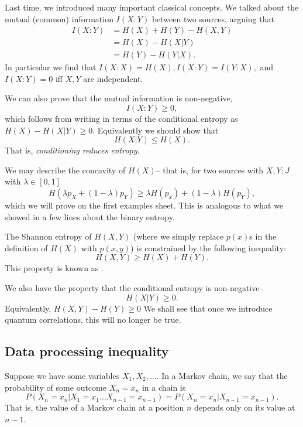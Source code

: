 Last time, we introduced many important classical concepts. We talked about the mutual (common) information $I(X:Y)$ between two sources, arguing that
\begin{align*}
    I(X:Y) &= H(X) + H(Y) - H(X,Y)\\
        &= H(X) - H(X|Y)\\
        &= H(Y)- H(Y|X).
\end{align*}
In particular we find that $I(X:X)=H(X), I(X:Y)=I(Y:X),$ and $I(X:Y)=0$ iff $X,Y$ are independent.

We can also prove that the mutual information is non-negative,
\begin{equation}
    I(X:Y) \geq 0,
\end{equation}
which follows from writing in terms of the conditional entropy as $H(X)-H(X|Y) \geq 0$. Equivalently we should show that
\begin{equation}
    H(X|Y) \leq H(X).
\end{equation}
That is, \emph{conditioning reduces entropy}.

We may describe the concavity of $H(X)$-- that is, for two sources with $X,Y; J$ with $\lambda\in [0,1]$
\begin{equation}
    H(\lambda p_X +(1-\lambda)p_Y) \geq \lambda H(p_x) + (1-\lambda) H(p_Y),
\end{equation}
which we will prove on the first examples sheet. This is analogous to what we showed in a few lines about the binary entropy.

The Shannon entropy of $H(X,Y)$ (where we simply replace $p(x)$s in the definition of $H(X)$ with $p(x,y)$) is constrained by the following inequality:
\begin{equation}
    H(X,Y) \geq H(X) + H(Y).
\end{equation}
This property is known as .

We also have the property that the conditional entropy is non-negative--
\begin{equation}
    H(X|Y) \geq 0.
\end{equation}
Equivalently, $H(X,Y) - H(Y) \geq 0$
We shall see that once we introduce quantum correlations, this will no longer be true.

\subsection*{Data processing inequality}
Suppose we have some variables $X_1,X_2,\ldots$. In a Markov chain, we say that the probability of some outcome $X_n=x_n$ in a chain is
\begin{equation}
    P(X_n=x_n | X_1=x_1 \ldots X_{n-1} = x_{n-1}) = P(X_n = x_n | X_{n-1} = x_{n-1}).
\end{equation}
That is, the value of a Markov chain at a position $n$ depends only on its value at $n-1$.


